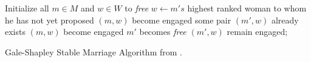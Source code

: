 \begin{algorithm}[t]

Initialize all $m \in M$ and $w \in W$ to \textit{free} \;
 {
	$w \leftarrow m's$ highest ranked woman to whom he has not yet proposed \;
	{ 
		$(m,w)$ become engaged \;
	}
	{
		some pair $(m',w)$ already exists \;
		{
			$(m,w)$ become engaged \;
			$m'$ becomes \textit{free} \;
		}
		{
			 $(m',w)$ remain engaged;
		}
	}
}
\caption{Gale-Shapley Stable Marriage Algorithm from \protect\cite{Gusfield1989SMP}.}
\label{alg:stable-matching}
\end{algorithm}


